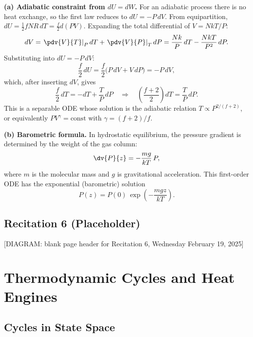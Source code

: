 \textbf{(a) Adiabatic constraint from $dU = dW$.}
For an adiabatic process there is no heat exchange, so the first law reduces to $dU = -P\,dV$. From equipartition, $dU = \tfrac{1}{2}fNR\,dT = \tfrac{f}{2}d(PV)$. Expanding the total differential of $V = NkT/P$:
\begin{equation}
    dV = \left.\pdv{V}{T}\right|_P dT + \left.\pdv{V}{P}\right|_T dP = \frac{Nk}{P}\,dT - \frac{NkT}{P^2}\,dP.
\end{equation}
Substituting into $dU = -P\,dV$:
\begin{equation}
    \frac{f}{2}\,dU = \frac{f}{2}\bigl(P\,dV + V\,dP\bigr) = -P\,dV,
\end{equation}
which, after inserting $dV$, gives
\begin{equation}
    \frac{f}{2}\,dT = -dT + \frac{T}{P}\,dP \quad\Longrightarrow\quad \left(\frac{f+2}{2}\right)dT = \frac{T}{P}\,dP.
\end{equation}
This is a separable ODE whose solution is the adiabatic relation $T \propto P^{2/(f+2)}$, or equivalently $PV^\gamma = \text{const}$ with $\gamma = (f+2)/f$.

\textbf{(b) Barometric formula.}
In hydrostatic equilibrium, the pressure gradient is determined by the weight of the gas column:
\begin{equation}
    \dv{P}{z} = -\frac{mg}{kT}\,P,
\end{equation}
where $m$ is the molecular mass and $g$ is gravitational acceleration. This first-order ODE has the exponential (barometric) solution
\begin{equation}
    P(z) = P(0)\,\exp\!\left(-\frac{mgz}{kT}\right).
\end{equation}

\section{Recitation 6 (Placeholder)}

\begin{center}[DIAGRAM: blank page header for Recitation 6, Wednesday February 19, 2025]\end{center}

\chapter{Thermodynamic Cycles and Heat Engines}

\section{Cycles in State Space}

